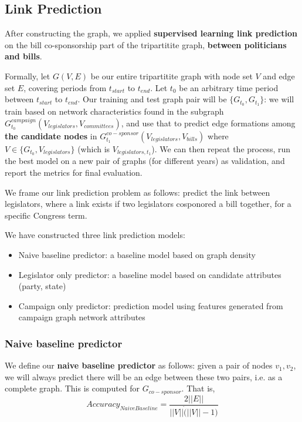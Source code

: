 \documentclass[12pt,twocolumn]{article}
\begin{document}
\subsection{Link Prediction}
After constructing the graph, we applied \textbf{supervised learning link prediction} on the bill co-sponsorship part of the tripartitite graph, \textbf{between politicians and bills}.

Formally, let $G(V,E)$ be our entire tripartitite graph with node set $V$ and edge set $E$, covering periods from $t_{start}$ to $t_{end}$. Let $t_0$ be an arbitrary time period between  $t_{start}$ to $t_{end}$. Our training and test graph pair will be $\{G_{t_{0}}, G_{t_{1}}\}$: we will train based on network characteristics found in the subgraph $G^{campaign}_{t_{0}}(V_{legislators}, V_{committees})$, and use that to predict edge formations among \textbf{the candidate nodes} in $G^{co-sponsor}_{t_{1}}(V_{legislators},V_{bills})$ where $V \in \{G_{t_{0}}, V_{legislators}\}$ (which is $V_{legislators, t_1}$). We can then repeat the process, run the best model on a new pair of graphs (for different years) as validation, and report the metrics for final evaluation. 

We frame our link prediction problem as follows: predict the link between legislators, where a link exists if two legislators cosponored a bill together, for a specific Congress term.  

We have constructed three link prediction models:
\begin{itemize}
    \item Naive baseline predictor: a baseline model based on graph density
    \item Legislator only predictor: a baseline model based on candidate attributes (party, state)
    \item Campaign only predictor: prediction model using features generated from campaign graph network attributes
\end{itemize}

\subsubsection{Naive baseline predictor}
We define our \textbf{naive baseline predictor} as follows: given a pair of nodes $v_1, v_2$, we will always predict there will be an edge between these two pairs, i.e. as a complete graph. This is computed for $G_{co-sponsor}$.  That is, $$Accuracy_{Naive Baseline} = \frac{2||E||}{||V|| \dot (||V|| - 1)} $$
\end{document}
